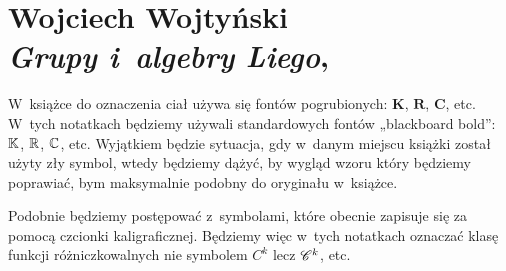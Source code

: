 \documentclass[a4paper,11pt]{article}
\numberwithin{equation}{section}
\begin{document}












\newpage

\section{ %
  Wojciech Wojtyński \\
  \textit{Grupy i~algebry Liego},
  \cite{WojtynskiGrupyIAlgebryLiego1986}}

\vspace{0em}



\vspace{0em}


\noindent
W~książce do oznaczenia ciał używa się fontów pogrubionych:
$\mathbf{K}$, $\mathbf{R}$, $\mathbf{C}$, etc. W~tych notatkach będziemy
używali standardowych fontów „blackboard bold”: $\mathbb{K}$, $\mathbb{R}$, $\mathbb{C}$, etc.
Wyjątkiem będzie sytuacja, gdy w~danym miejscu książki został użyty zły
symbol, wtedy będziemy dążyć, by wygląd wzoru który będziemy poprawiać, bym
maksymalnie podobny do oryginału w~książce.

Podobnie będziemy postępować z~symbolami, które obecnie zapisuje się za
pomocą czcionki kaligraficznej. Będziemy więc w~tych notatkach oznaczać
klasę funkcji różniczkowalnych nie symbolem $C^{ k }$ lecz $\mathcal{C}^{ k }$,
etc.
\end{document}
